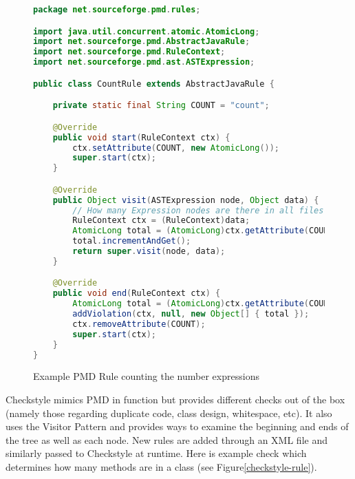 \documentclass[12pt]{report}
\newcommand{\todoin}{\todo[inline]}
\def\lstlistingname{Figure}
\newcommand{\refCode}{\lstlistingname \hspace{1mm}}
\begin{document}
\begin{figure}
\caption[Example PMD Rule]{Example PMD Rule counting the number expressions}
\label{pmd-rule}
\begin{lstlisting}[language=Java]
package net.sourceforge.pmd.rules;

import java.util.concurrent.atomic.AtomicLong;
import net.sourceforge.pmd.AbstractJavaRule;
import net.sourceforge.pmd.RuleContext;
import net.sourceforge.pmd.ast.ASTExpression;

public class CountRule extends AbstractJavaRule {

	private static final String COUNT = "count";

	@Override
	public void start(RuleContext ctx) {
		ctx.setAttribute(COUNT, new AtomicLong());
		super.start(ctx);
	}

	@Override
	public Object visit(ASTExpression node, Object data) {
		// How many Expression nodes are there in all files parsed! 
		RuleContext ctx = (RuleContext)data;
		AtomicLong total = (AtomicLong)ctx.getAttribute(COUNT);
		total.incrementAndGet();
		return super.visit(node, data);
	}

	@Override
	public void end(RuleContext ctx) {
		AtomicLong total = (AtomicLong)ctx.getAttribute(COUNT);
		addViolation(ctx, null, new Object[] { total });
		ctx.removeAttribute(COUNT);
		super.start(ctx);
	}
}
\end{lstlisting}
\end{figure}

Checkstyle mimics PMD in function but provides different checks out of the box (namely those 
regarding duplicate code, class design, whitespace, etc). It also uses the Visitor Pattern and 
provides ways to examine the beginning and ends of the tree as well as each node. New rules are 
added through an XML file and similarly passed to Checkstyle at runtime. Here is example check 
which determines how many methods are in a class (see \refCode \ref{checkstyle-rule}).
\todoin{pad this out into its own}
\nocite{framaC}
\end{document}
